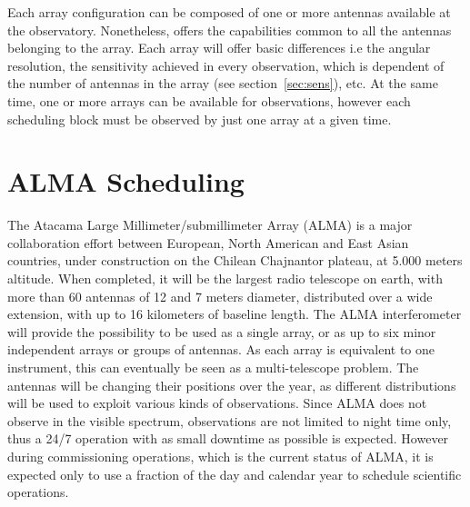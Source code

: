 Each array configuration can be composed of one or more antennas available at the observatory. Nonetheless, offers the capabilities common to all the antennas belonging to the array. Each array will offer basic differences i.e the angular resolution, the sensitivity achieved in every observation, which is dependent of the number of antennas in the array (see section~\ref{sec:sens}), etc. At the same time, one or more arrays can be available for observations, however each scheduling block must be observed by just one array at a given time.

\section{ALMA Scheduling}
\label{sec:alma-sched-problem}
The Atacama Large Millimeter/submillimeter Array (ALMA) is a major collaboration effort between European, North American and East Asian countries, under construction on the Chilean Chajnantor plateau, at 5.000 meters altitude. When completed, it will be the largest radio telescope on earth, with more than 60 antennas of 12 and 7 meters diameter, distributed over a wide extension, with up to 16 kilometers of baseline length. The ALMA interferometer will provide the possibility to be used as a single array, or as up to six minor independent arrays or groups of antennas. As each array is equivalent to one instrument, this can eventually be seen as a multi-telescope problem. The antennas will be changing their positions over the year, as different distributions will be used to exploit various kinds of observations. Since ALMA does not observe in the visible spectrum, observations are not limited to night time only, thus a 24/7 operation with as small downtime as possible is expected. However during commissioning operations, which is the current status of ALMA, it is expected only to use a fraction of the day and calendar year to schedule scientific operations.

